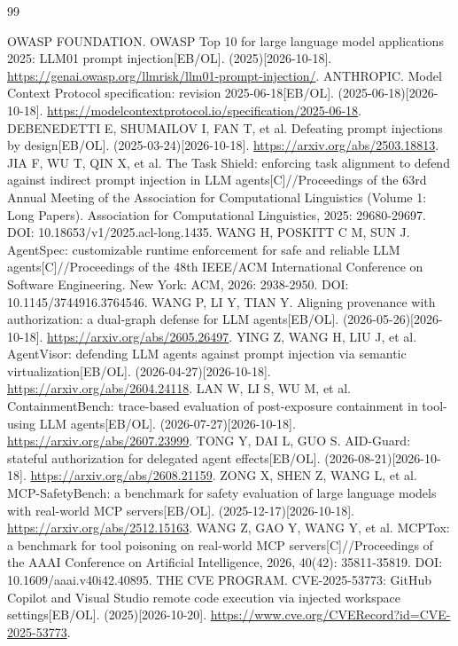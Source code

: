 \begin{thebibliography}{99}
\raggedright
{}
 OWASP FOUNDATION. OWASP Top 10 for large language model applications 2025: LLM01 prompt injection[EB/OL]. (2025)[2026-10-18]. \url{https://genai.owasp.org/llmrisk/llm01-prompt-injection/}.
 ANTHROPIC. Model Context Protocol specification: revision 2025-06-18[EB/OL]. (2025-06-18)[2026-10-18]. \url{https://modelcontextprotocol.io/specification/2025-06-18}.
 DEBENEDETTI E, SHUMAILOV I, FAN T, et al. Defeating prompt injections by design[EB/OL]. (2025-03-24)[2026-10-18]. \url{https://arxiv.org/abs/2503.18813}.
 JIA F, WU T, QIN X, et al. The Task Shield: enforcing task alignment to defend against indirect prompt injection in LLM agents[C]//Proceedings of the 63rd Annual Meeting of the Association for Computational Linguistics (Volume 1: Long Papers). Association for Computational Linguistics, 2025: 29680-29697. DOI: 10.18653/v1/2025.acl-long.1435.
 WANG H, POSKITT C M, SUN J. AgentSpec: customizable runtime enforcement for safe and reliable LLM agents[C]//Proceedings of the 48th IEEE/ACM International Conference on Software Engineering. New York: ACM, 2026: 2938-2950. DOI: 10.1145/3744916.3764546.
 WANG P, LI Y, TIAN Y. Aligning provenance with authorization: a dual-graph defense for LLM agents[EB/OL]. (2026-05-26)[2026-10-18]. \url{https://arxiv.org/abs/2605.26497}.
 YING Z, WANG H, LIU J, et al. AgentVisor: defending LLM agents against prompt injection via semantic virtualization[EB/OL]. (2026-04-27)[2026-10-18]. \url{https://arxiv.org/abs/2604.24118}.
 LAN W, LI S, WU M, et al. ContainmentBench: trace-based evaluation of post-exposure containment in tool-using LLM agents[EB/OL]. (2026-07-27)[2026-10-18]. \url{https://arxiv.org/abs/2607.23999}.
 TONG Y, DAI L, GUO S. AID-Guard: stateful authorization for delegated agent effects[EB/OL]. (2026-08-21)[2026-10-18]. \url{https://arxiv.org/abs/2608.21159}.
 ZONG X, SHEN Z, WANG L, et al. MCP-SafetyBench: a benchmark for safety evaluation of large language models with real-world MCP servers[EB/OL]. (2025-12-17)[2026-10-18]. \url{https://arxiv.org/abs/2512.15163}.
 WANG Z, GAO Y, WANG Y, et al. MCPTox: a benchmark for tool poisoning on real-world MCP servers[C]//Proceedings of the AAAI Conference on Artificial Intelligence, 2026, 40(42): 35811-35819. DOI: 10.1609/aaai.v40i42.40895.
 THE CVE PROGRAM. CVE-2025-53773: GitHub Copilot and Visual Studio remote code execution via injected workspace settings[EB/OL]. (2025)[2026-10-20]. \url{https://www.cve.org/CVERecord?id=CVE-2025-53773}.

\end{thebibliography}
